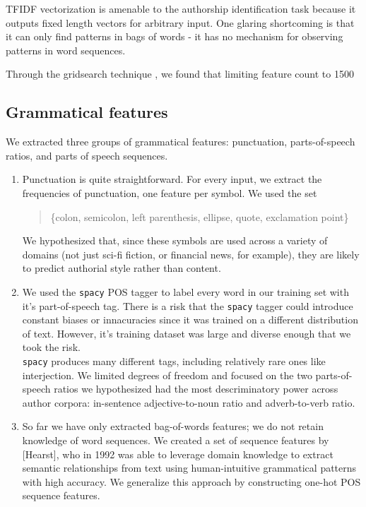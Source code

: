\documentclass[12pt]{article}
\begin{document}
TFIDF vectorization is amenable to the authorship identification task because it outputs fixed length vectors for arbitrary input. One glaring shortcoming is that it can only find patterns in bags of words - it has no mechanism for observing patterns in word sequences.

Through the gridsearch technique , we found that limiting feature count to 1500

\subsection{Grammatical features}
We extracted three groups of grammatical features: punctuation, parts-of-speech ratios, and parts of speech sequences.

\begin{enumerate}
  \item Punctuation is quite straightforward. For every input, we extract the frequencies of punctuation, one feature per symbol. We used the set 
  \begin{quote} \{colon, semicolon, left parenthesis, ellipse, quote, exclamation point\}
  \end{quote} 
  We hypothesized that, since these symbols are used across a variety of domains (not just sci-fi fiction, or financial news, for example), they are likely to predict authorial style rather than content.
  \item We used the \texttt{spacy} POS tagger to label every word in our training set with it's part-of-speech tag. There is a risk that the \texttt{spacy} tagger could introduce constant biases or innacuracies since it was trained on a different distribution of text. However, it's training dataset was large and diverse enough that we took the risk.
  \\
  \texttt{spacy} produces many different tags, including relatively rare ones like interjection. We limited degrees of freedom and focused on the two parts-of-speech ratios we hypothesized had the most descriminatory power across author corpora: in-sentence adjective-to-noun ratio and adverb-to-verb ratio.
  \item So far we have only extracted bag-of-words features; we do not retain knowledge of word sequences. We created a set of sequence features by [Hearst], who in 1992 was able to leverage domain knowledge to extract semantic relationships from text using human-intuitive grammatical patterns with high accuracy. We generalize this approach by constructing one-hot POS sequence features. 


\end{enumerate}
\end{document}

